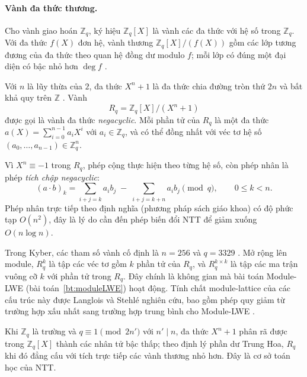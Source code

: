 \documentclass[../LuanVan.tex]{subfiles}
\begin{document}
\paragraph{Vành đa thức thương.} Cho vành giao hoán $\mathbb{Z}_q$, ký hiệu $\mathbb{Z}_q[X]$ là vành các đa thức với hệ số trong $\mathbb{Z}_q$. Với đa thức $f(X)$ đơn hệ, vành thương $\mathbb{Z}_q[X]/(f(X))$ gồm các lớp tương đương của đa thức theo quan hệ đồng dư modulo $f$; mỗi lớp có đúng một đại diện có bậc nhỏ hơn $\deg f$ \cite{LidlNiederreiter97}.

\begin{dn}
    Với $n$ là lũy thừa của $2$, đa thức $X^n+1$ là đa thức chia đường tròn thứ $2n$ và bất khả quy trên $\mathbb{Z}$ \cite{LyubashevskyPR13}. Vành
    \begin{equation}
        R_q = \mathbb{Z}_q[X]/(X^n+1)
    \end{equation}
    được gọi là vành đa thức \textit{negacyclic}. Mỗi phần tử của $R_q$ là một đa thức $a(X)=\sum_{i=0}^{n-1} a_i X^i$ với $a_i\in\mathbb{Z}_q$, và có thể đồng nhất với véc tơ hệ số $(a_0,\dots,a_{n-1})\in \mathbb{Z}_q^n$.
\end{dn}

Vì $X^n \equiv -1$ trong $R_q$, phép cộng thực hiện theo từng hệ số, còn phép nhân là phép \textit{tích chập negacyclic}:
\begin{equation}
    (a\cdot b)_k = \sum_{i+j=k} a_i b_j \;-\; \sum_{i+j=k+n} a_i b_j \pmod q, \qquad 0\le k<n.
\end{equation}
Phép nhân trực tiếp theo định nghĩa (phương pháp sách giáo khoa) có độ phức tạp $O(n^2)$, đây là lý do cần đến phép biến đổi NTT để giảm xuống $O(n\log n)$.

Trong Kyber, các tham số vành cố định là $n=256$ và $q=3329$ \cite{Bos18,Avanzi21}. Mở rộng lên module, $R_q^k$ là tập các véc tơ gồm $k$ phần tử của $R_q$, và $R_q^{k\times k}$ là tập các ma trận vuông cỡ $k$ với phần tử trong $R_q$. Đây chính là không gian mà bài toán Module-LWE (bài toán~\ref{bt:moduleLWE}) hoạt động. Tính chất module-lattice của các cấu trúc này được Langlois và Stehlé nghiên cứu, bao gồm phép quy giảm từ trường hợp xấu nhất sang trường hợp trung bình cho Module-LWE \cite{LangloisStehle15}.

Khi $\mathbb{Z}_q$ là trường và $q\equiv 1 \pmod{2n'}$ với $n'\mid n$, đa thức $X^n+1$ phân rã được trong $\mathbb{Z}_q[X]$ thành các nhân tử bậc thấp; theo định lý phần dư Trung Hoa, $R_q$ khi đó đẳng cấu với tích trực tiếp các vành thương nhỏ hơn. Đây là cơ sở toán học của NTT.
\end{document}
